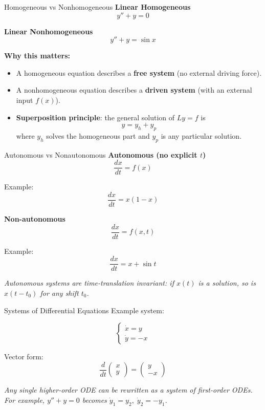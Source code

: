 \begin{frame}{Homogeneous vs Nonhomogeneous}
\textbf{Linear Homogeneous}
\[
y'' + y = 0
\]

\textbf{Linear Nonhomogeneous}
\[
y'' + y = \sin x
\]

\textbf{Why this matters:}

\begin{itemize}
    \item A homogeneous equation describes a \textbf{free system} (no external driving force).
    \item A nonhomogeneous equation describes a \textbf{driven system} (with an external input $f(x)$).
    \item \textbf{Superposition principle}: the general solution of $Ly = f$ is
    \[
    y = y_h + y_p
    \]
    where $y_h$ solves the homogeneous part and $y_p$ is any particular solution.
\end{itemize}
\end{frame}

\begin{frame}{Autonomous vs Nonautonomous}
\textbf{Autonomous (no explicit $t$)}
\[
\frac{dx}{dt} = f(x)
\]

Example:
\[
\frac{dx}{dt} = x(1-x)
\]

\textbf{Non-autonomous}
\[
\frac{dx}{dt} = f(x,t)
\]

Example:
\[
\frac{dx}{dt} = x + \sin t
\]

\vspace{0.3cm}
\textit{Autonomous systems are time-translation invariant: if $x(t)$ is a solution, so is $x(t - t_0)$ for any shift $t_0$.}
\end{frame}

\begin{frame}{Systems of Differential Equations}
Example system:

\[
\begin{cases}
\dot{x} = y \\
\dot{y} = -x
\end{cases}
\]

Vector form:
\[
\frac{d}{dt}
\begin{pmatrix}
 x \\
 y
\end{pmatrix}
=
\begin{pmatrix}
 y \\
 -x
\end{pmatrix}
\]

\vspace{0.3cm}
\textit{Any single higher-order ODE can be rewritten as a system of first-order ODEs. For example, $y'' + y = 0$ becomes $\dot{y}_1 = y_2,\; \dot{y}_2 = -y_1$.}
\end{frame}


